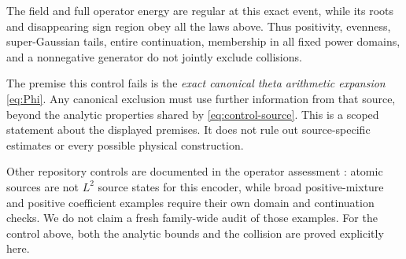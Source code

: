 The field and full operator energy are regular at this exact event,
while its roots and disappearing sign region obey all the laws above.
Thus positivity, evenness, super-Gaussian tails, entire continuation,
membership in all fixed power domains, and a nonnegative generator
do not jointly exclude collisions.

The premise this control fails is the \emph{exact canonical theta
arithmetic expansion} \eqref{eq:Phi}. Any canonical exclusion
must use further information from that source, beyond the analytic
properties shared by \eqref{eq:control-source}. This is a scoped
statement about the displayed premises. It does not rule out
source-specific estimates or every possible physical construction.

Other repository controls are documented in the operator assessment
\cite{OperatorAssessment}: atomic sources are not \(L^2\) source
states for this encoder, while broad positive-mixture and positive
coefficient examples require their own domain and continuation
checks. We do not claim a fresh family-wide audit of those examples.
For the control above, both the analytic bounds and the collision
are proved explicitly here.
